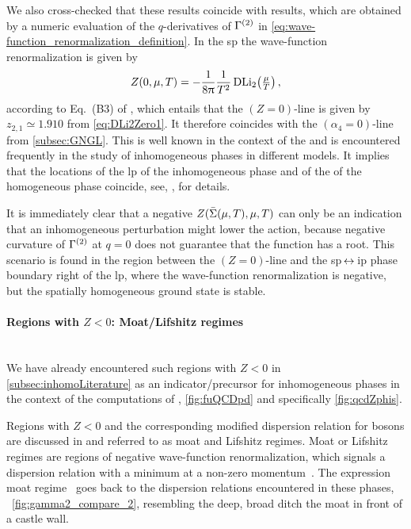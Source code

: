 We also cross-checked that these results coincide with results, which are obtained by a numeric evaluation of the $q$-derivatives of $\Gamma^{(2)}$ in \cref{eq:wave-function_renormalization_definition}.
In the \gls{sp} the wave-function renormalization is given by 
\begin{align}
	Z ( 0, \mu, T ) = - \frac{1}{8 \uppi} \frac{1}{T^2} \, \mathrm{DLi}_{2} \big( \tfrac{\mu}{T} \big) \, ,	\label{eq:z_0_mu_t}
\end{align}
according to Eq.~(B3) of , which entails that the ${(Z=0)}$-line  is given by ${z_{2,1}\simeq1.910}$ from \cref{eq:DLi2Zero1}.
It therefore coincides with the $(\alpha_4=0)$-line from \cref{subsec:GNGL}.
This is well known in the context of the \ggla{} and is encountered frequently in the study of inhomogeneous phases in different models.
It implies that the locations of the \gls{lp} of the inhomogeneous phase and of the \cp{} of the homogeneous phase coincide, see, \eg{},  for details.

It is immediately clear that a negative $Z ( \bar{\Sigma} ( \mu, T ), \mu, T )$ can only be an indication that an inhomogeneous perturbation might lower the action, because negative curvature of $\Gamma^{(2)}$ at ${q = 0}$ does not guarantee that the function has a root.
This scenario is found in the region between the $(Z=0)$-line and the \gls{sp}$\,\leftrightarrow\,$\gls{ip} phase boundary right of the \gls{lp}, where the wave-function renormalization is negative, but the spatially homogeneous ground state is stable.

\FloatBarrier
\paragraph{Regions with $Z<0$: Moat/Lifshitz regimes}\label{paragraph:moat}\mbox{}\\%
We have already encountered such regions with $Z<0$ in \cref{subsec:inhomoLiterature} as an indicator/precursor for inhomogeneous phases in the context of the \frg{} \qcd{} computations of , \cf{} \cref{fig:fuQCDpd} and specifically \cref{fig:qcdZphis}.

Regions with $Z<0$ and the corresponding modified dispersion relation for bosons are discussed in  and referred to as moat and Lifshitz regimes.
Moat or Lifshitz regimes are regions of negative wave-function renormalization, which signals a dispersion relation with a minimum at a non-zero momentum~\cite{Rennecke:2021ovl,Pisarski:2021qof, Pisarski:2020gkx,Pisarski:2020dnx}. The expression moat regime~\cite{Pisarski:2021qof,Rennecke:2021ovl} goes back to the dispersion relations encountered in these phases, \cf{}\ \cref{fig:gamma2_compare_2}, resembling the  deep, broad ditch \dash{} the moat \dash{} in front of a castle wall.
	
